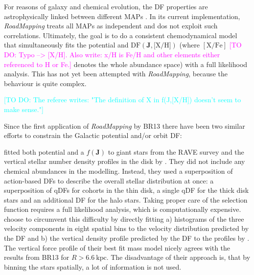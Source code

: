 \documentclass[iop,revtex4]{emulateapj}
\newcommand{\vect}[1]{\boldsymbol{#1}}
\newcommand{\MAPs}{MAPs}
\newcommand{\RM}{{\sl RoadMapping}}
\newcommand{\HW}[1]{\textcolor{Cyan}{#1}}
\newcommand{\Wilma}[1]{\textcolor{Magenta}{#1}}
\begin{document}
For reasons of galaxy and chemical evolution, the DF properties are astrophysically linked between different \MAPs{} \citep{2015MNRAS.449.3479S}. In its current implementation, \RM{} treats all \MAPs{} as independent and dos not exploit such correlations. Ultimately, the goal is to do a consistent chemodynamical model that simultaneously fits the potential and $\text{DF}(\vect{J},\text{[X/H]})$ (where $[\mathrm{X}/\mathrm{Fe}]$ \Wilma{[TO DO: Typo --> [X/H]. Also write: x/H is Fe/H and other elements either referenced to H or Fe.]} denotes the whole abundance space) with a full likelihood analysis. This has not yet been attempted with \RM{}, because the behaviour is quite complex. 

\HW{[TO DO: The referee writes: "The definition of X in f(J,[X/H]) doesn't seem to make sense."]}

Since the first application of \RM{} by BR13 there have been two similar efforts to constrain the Galactic potential and/or orbit DF:

\citet{2014MNRAS.445.3133P} fitted both potential and a $f(\vect{J})$ to giant stars from the RAVE survey \citep{2006AJ....132.1645S} and the vertical stellar number density profiles in the disk by \citet{2008ApJ...673..864J}. They did not include any chemical abundances in the modelling. Instead, they used a superposition of action-based DFs to describe the overall stellar distribution at once: a superposition of qDFs for cohorts in the thin disk, a single qDF for the thick disk stars and an additional DF for the halo stars. Taking proper care of the selection function requires a full likelihood analysis, which is computationally expensive. \citet{2014MNRAS.445.3133P} choose to circumvent this difficulty by directly fitting a) histograms of the three velocity components in eight spatial bins to the velocity distribution predicted by the DF and b) the vertical density profile predicted by the DF to the profiles by \citet{2008ApJ...673..864J}. The vertical force profile of their best fit mass model nicely agrees with the results from BR13 for $R>6.6~\text{kpc}$. The disadvantage of their approach is, that by binning the stars spatially, a lot of information is not used.
\end{document}
